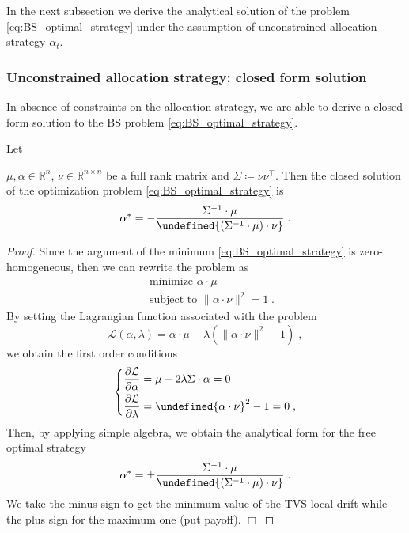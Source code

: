 \documentclass[runningheads]{m2ef}
\newcommand{\tr}[1]{{#1}^{\intercal}} %
\newenvironment{eqsys}{\begin{equation}\begin{dcases}}{\end{dcases}\end{equation}}
\let\norm\undefined %
\DeclarePairedDelimiter\norm{\lVert}{\rVert}
\newcommand\soutpars[1]{\let\helpcmd\sout\parhelp#1\par\relax\relax}
\newcommand{\remove}[1]{{\color{red} \soutpars{{#1}}}}%
\begin{document}
	In the next subsection we derive the analytical solution of the problem \eqref{eq:BS_optimal_strategy} under the assumption of unconstrained allocation strategy $\alpha_t$.


	\subsubsection{Unconstrained allocation strategy: closed form solution}
	In absence of constraints on the allocation strategy, we are able to derive a closed form solution to the BS problem \eqref{eq:BS_optimal_strategy}.
	\begin{lemma}
		Let \remove{be} $\mu, \alpha \in \mathbb{R}^n$, $\nu \in \mathbb{R}^{n\times n}$ be a full rank matrix and $\Sigma\coloneqq \nu \tr{\nu}$. Then the closed solution of the optimization problem \eqref{eq:BS_optimal_strategy} is 
		\begin{equation}
				\alpha^* = - \frac{\Sigma^{-1} \cdot \mu}{\norm{(\Sigma^{-1} \cdot \mu)\cdot \nu}} \; .
		\end{equation}
	\end{lemma}
	\begin{proof}
	Since the argument of the minimum \eqref{eq:BS_optimal_strategy} is zero-homogeneous, then we can rewrite the problem as
	\begin{equation}
			\begin{aligned}
				&\text { minimize } \alpha \cdot \mu\\
				&\text { subject to } \|\alpha \cdot \nu\|^2=1 \; .
		\end{aligned}
	\end{equation}
	By setting the Lagrangian function associated with the problem
	\begin{equation}
		\mathcal{L}\left(\alpha, \lambda\right)=\alpha \cdot \mu-\lambda\left(\|\alpha \cdot \nu\|^2-1\right) \; ,
	\end{equation}
	we obtain the first order conditions
	\begin{eqsys}
		\frac{\partial \mathcal{L}}{\partial \alpha}=\mu -2\lambda \Sigma \cdot \alpha=0 \\
		\frac{\partial \mathcal{L}}{\partial \lambda}= \norm{\alpha \cdot \nu}^2-1=0
		\; ,
	\end{eqsys}
	Then, by applying simple algebra, we obtain the analytical form for the free optimal strategy
	\begin{equation}
		\alpha^* = \pm \frac{\Sigma^{-1} \cdot \mu}{\norm{(\Sigma^{-1} \cdot \mu)\cdot \nu}} \; .
	\label{eq:analytical_solution_free_strategy}\end{equation}
	We take the minus sign to get the minimum value of the TVS local drift while the plus sign for the maximum one (put payoff). $\Box$
	\end{proof}
\end{document}
